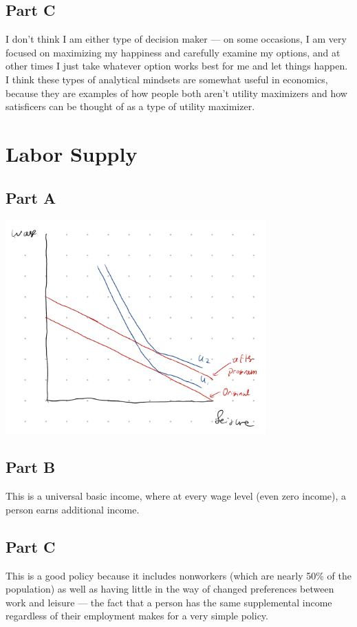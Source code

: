 \documentclass[8pt]{extarticle}
\begin{document}
{\subsection*{Part C}
I don't think I am either type of decision maker — on some occasions, I am very focused on maximizing my happiness and carefully examine my options, and at other times I just take whatever option works best for me and let things happen. I think these types of analytical mindsets are somewhat useful in economics, because they are examples of how people both aren't utility maximizers and how satisficers can be thought of as a type of utility maximizer.
\section*{Labor Supply}
\subsection*{Part A}
\begin{center}
	\includegraphics[width=10cm]{HW5Q3A}
\end{center}
\subsection*{Part B}
This is a universal basic income, where at every wage level (even zero income), a person earns additional income.
\subsection*{Part C}
This is a good policy because it includes nonworkers (which are nearly 50\% of the population) as well as having little in the way of changed preferences between work and leisure — the fact that a person has the same supplemental income regardless of their employment makes for a very simple policy.
}
\end{document}
